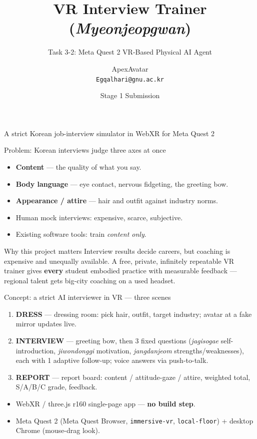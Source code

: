 \documentclass{beamer}
\title{VR Interview Trainer (\emph{Myeonjeopgwan})}
\subtitle{Task 3-2: Meta Quest 2 VR-Based Physical AI Agent}
\author{ApexAvatar \\ \texttt{Egqalhari@gnu.ac.kr}}
\institute{Glocal Project, Gyeongsang National University}
\date{Stage 1 Submission}
\begin{document}
\begin{frame}
  \titlepage
  \begin{center}\footnotesize A strict Korean job-interview simulator in WebXR for Meta Quest 2\end{center}
\end{frame}

\begin{frame}{Problem: Korean interviews judge three axes at once}
  \begin{itemize}
    \item \textbf{Content} --- the quality of what you say.
    \item \textbf{Body language} --- eye contact, nervous fidgeting, the greeting bow.
    \item \textbf{Appearance / attire} --- hair and outfit against industry norms.
  \end{itemize}
  \bigskip
  \begin{itemize}
    \item Human mock interviews: expensive, scarce, subjective.
    \item Existing software tools: train \emph{content only}.
  \end{itemize}
  \begin{block}{Why this project matters}
    \small Interview results decide careers, but coaching is expensive and unequally available. A free, private, infinitely repeatable VR trainer gives \textbf{every} student embodied practice with measurable feedback --- regional talent gets big-city coaching on a used headset.
  \end{block}
\end{frame}

\begin{frame}{Concept: a strict AI interviewer in VR --- three scenes}
  \begin{enumerate}
    \item \textbf{DRESS} --- dressing room: pick hair, outfit, target industry; avatar at a fake mirror updates live.
    \item \textbf{INTERVIEW} --- greeting bow, then 3 fixed questions (\emph{jagisogae} self-introduction, \emph{jiwondonggi} motivation, \emph{jangdanjeom} strengths/weaknesses), each with 1 adaptive follow-up; voice answers via push-to-talk.
    \item \textbf{REPORT} --- report board: content / attitude-gaze / attire, weighted total, S/A/B/C grade, feedback.
  \end{enumerate}
  \bigskip
  \begin{itemize}
    \item WebXR / three.js r160 single-page app --- \textbf{no build step}.
    \item Meta Quest 2 (Meta Quest Browser, \texttt{immersive-vr}, \texttt{local-floor}) + desktop Chrome (mouse-drag look).
  \end{itemize}
\end{frame}
\end{document}
